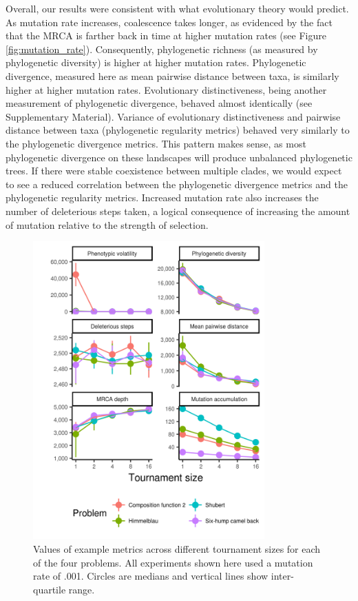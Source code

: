 \documentclass[letterpaper]{article}
\begin{document}
Overall, our results were consistent with what evolutionary theory would predict. As mutation rate increases, coalescence takes longer, as evidenced by the fact that the MRCA is farther back in time at higher mutation rates (see Figure \ref{fig:mutation_rate}). Consequently, phylogenetic richness (as measured by phylogenetic diversity) is higher at higher mutation rates. Phylogenetic divergence, measured here as mean pairwise distance between taxa, is similarly higher at higher mutation rates. Evolutionary distinctiveness, being another measurement of phylogenetic divergence, behaved almost identically (see Supplementary Material). Variance of evolutionary distinctiveness and pairwise distance between taxa (phylogenetic regularity metrics) behaved very similarly to the phylogenetic divergence metrics. This pattern makes sense, as most phylogenetic divergence on these landscapes will produce unbalanced phylogenetic trees. If there were stable coexistence between multiple clades, we would expect to see a reduced correlation between the phylogenetic divergence metrics and the phylogenetic regularity metrics. Increased mutation rate also increases the number of deleterious steps taken, a logical consequence of increasing the amount of mutation relative to the strength of selection.

\begin{figure}
\includegraphics[width=3.5in]{figs/all_ts.png}
\caption{Values of example metrics across different tournament sizes for each of the four problems. All experiments shown here used a mutation rate of .001. Circles are medians and vertical lines show inter-quartile range.}
\label{fig:ts}
\end{figure}
\end{document}
